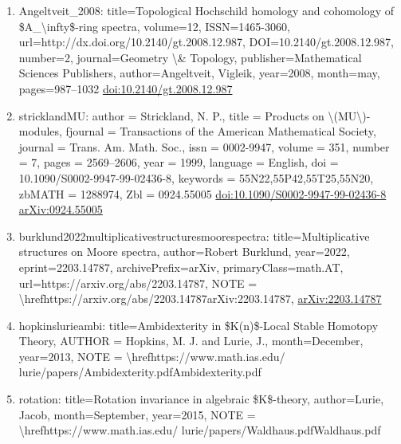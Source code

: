 \documentclass[11pt]{article}
\begin{document}
\begin{enumerate}[leftmargin=*]
  \item Angeltveit\_2008: title=Topological Hochschild homology and cohomology of \$A\_\textbackslash{}infty\$-ring spectra, volume=12, ISSN=1465-3060, url=http://dx.doi.org/10.2140/gt.2008.12.987, DOI=10.2140/gt.2008.12.987, number=2, journal=Geometry \textbackslash{}\& Topology, publisher=Mathematical Sciences Publishers, author=Angeltveit, Vigleik, year=2008, month=may, pages=987--1032 \href{https://doi.org/10.2140/gt.2008.12.987}{doi:10.2140/gt.2008.12.987}
  \item stricklandMU: author = Strickland, N. P., title = Products on \textbackslash{}(MU\textbackslash{})-modules, fjournal = Transactions of the American Mathematical Society, journal = Trans. Am. Math. Soc., issn = 0002-9947, volume = 351, number = 7, pages = 2569--2606, year = 1999, language = English, doi = 10.1090/S0002-9947-99-02436-8, keywords = 55N22,55P42,55T25,55N20, zbMATH = 1288974, Zbl = 0924.55005 \href{https://doi.org/10.1090/S0002-9947-99-02436-8}{doi:10.1090/S0002-9947-99-02436-8} \href{https://arxiv.org/abs/0924.55005}{arXiv:0924.55005}
  \item burklund2022multiplicativestructuresmoorespectra: title=Multiplicative structures on Moore spectra, author=Robert Burklund, year=2022, eprint=2203.14787, archivePrefix=arXiv, primaryClass=math.AT, url=https://arxiv.org/abs/2203.14787, NOTE = \textbackslash{}hrefhttps://arxiv.org/abs/2203.14787arXiv:2203.14787, \href{https://arxiv.org/abs/2203.14787}{arXiv:2203.14787}
  \item hopkinslurieambi: title=Ambidexterity in \$K(n)\$-Local Stable Homotopy Theory, AUTHOR = Hopkins, M. J. and Lurie, J., month=December, year=2013, NOTE = \textbackslash{}hrefhttps://www.math.ias.edu/ lurie/papers/Ambidexterity.pdfAmbidexterity.pdf
  \item rotation: title=Rotation invariance in algebraic \$K\$-theory, author=Lurie, Jacob, month=September, year=2015, NOTE = \textbackslash{}hrefhttps://www.math.ias.edu/ lurie/papers/Waldhaus.pdfWaldhaus.pdf

\end{enumerate}
\end{document}
